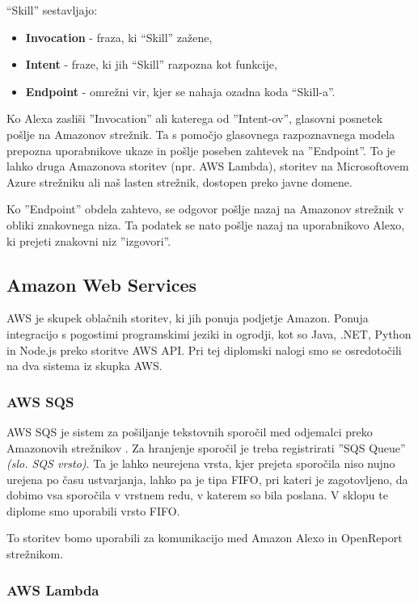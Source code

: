 \documentclass[a4paper, 12pt]{book}
\begin{document}
\noindent \enquote{Skill} sestavljajo:
\begin{itemize}
	\item \textbf{Invocation} - fraza, ki \enquote{Skill} zažene,
	\item \textbf{Intent} - fraze, ki jih \enquote{Skill} razpozna kot funkcije,
	\item \textbf{Endpoint} - omrežni vir, kjer se nahaja ozadna koda \enquote{Skill-a}.
\end{itemize}

Ko Alexa zasliši ''Invocation'' ali katerega od ''Intent-ov'', glasovni posnetek pošlje na Amazonov strežnik.
Ta s pomočjo glasovnega razpoznavnega modela prepozna uporabnikove ukaze in pošlje poseben zahtevek na ''Endpoint''.
To je lahko druga Amazonova storitev (npr. AWS Lambda), storitev na Microsoftovem Azure strežniku ali naš lasten strežnik, dostopen preko javne domene.

Ko ''Endpoint'' obdela zahtevo, se odgovor pošlje nazaj na Amazonov strežnik v obliki znakovnega niza.
Ta podatek se nato pošlje nazaj na uporabnikovo Alexo, ki prejeti znakovni niz ''izgovori''.

\subsection{Amazon Web Services}

AWS je skupek oblačnih storitev, ki jih ponuja podjetje Amazon.
Ponuja integracijo s pogostimi programskimi jeziki in ogrodji, kot so Java, .NET, Python in Node.js preko storitve AWS API.
Pri tej diplomski nalogi smo se osredotočili na dva sistema iz skupka AWS.

\subsubsection{AWS SQS}

AWS SQS je sistem za pošiljanje tekstovnih sporočil med odjemalci preko Amazonovih strežnikov \cite{sqs}.
Za hranjenje sporočil je treba registrirati ''SQS Queue'' \textit{(slo. SQS vrsto)}. 
Ta je lahko neurejena vrsta, kjer prejeta sporočila niso nujno urejena po času ustvarjanja, lahko pa je tipa FIFO, pri kateri je zagotovljeno, da dobimo vsa sporočila v vrstnem redu, v katerem so bila poslana.
V sklopu te diplome smo uporabili vrsto FIFO.

To storitev bomo uporabili za komunikacijo med Amazon Alexo in OpenReport strežnikom.

\subsubsection{AWS Lambda}
\end{document}
